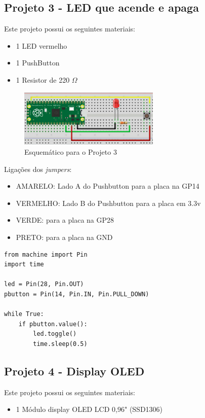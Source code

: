 \documentclass[a4paper,11pt]{article}
\begin{document}
\subsection{Projeto 3 - LED que acende e apaga}

Este projeto possui os seguintes materiais: \vspace{-1em}
\begin{itemize}
	\item 1 LED vermelho
	\item 1 PushButton
	\item 1 Resistor de 220 $\Omega$
\end{itemize}

\begin{figure}[H]
	\centering
	\includegraphics[width=0.6\textwidth]{imagem/PicoProj3}
	\caption{Esquemático para o Projeto 3}
\end{figure}

Ligações dos \textit{jumpers}: \vspace{-1em}
\begin{itemize}
	\item AMARELO: Lado A do Pushbutton para a placa na GP14
	\item VERMELHO: Lado B do Pushbutton para a placa em 3.3v
	\item VERDE: para a placa na GP28
	\item PRETO: para a placa na GND
\end{itemize}

\begin{lstlisting}
from machine import Pin
import time

led = Pin(28, Pin.OUT)
pbutton = Pin(14, Pin.IN, Pin.PULL_DOWN)

while True:
	if pbutton.value():
		led.toggle()
		time.sleep(0.5)
\end{lstlisting}

\subsection{Projeto 4 - Display OLED}

Este projeto possui os seguintes materiais: \vspace{-1em}
\begin{itemize}
	\item 1 Módulo display OLED LCD 0,96" (SSD1306)
\end{itemize}
\end{document}
